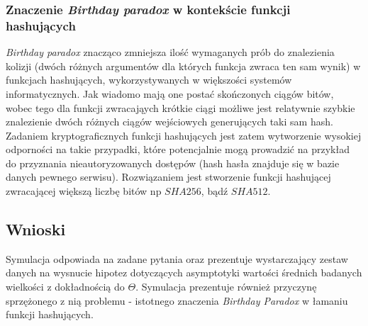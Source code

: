 \documentclass{article}
\begin{document}
\subsubsection{Znaczenie \textit{Birthday paradox} w kontekście funkcji hashujących}

\textit{Birthday paradox} znacząco zmniejsza ilość wymaganych prób do znalezienia kolizji (dwóch różnych argumentów dla których funkcja zwraca ten sam wynik) w funkcjach hashujących, wykorzystywanych w większości systemów informatycznych. Jak wiadomo mają one postać skończonych ciągów bitów, wobec tego dla funkcji zwracająych krótkie ciągi możliwe jest relatywnie szybkie znalezienie dwóch różnych ciągów wejściowych generujących taki sam hash. Zadaniem kryptograficznych funkcji hashujących jest zatem wytworzenie wysokiej odporności na takie przypadki, które potencjalnie mogą prowadzić na przykład do przyznania nieautoryzowanych dostępów (hash hasła znajduje się w bazie danych pewnego serwisu). Rozwiązaniem jest stworzenie funkcji hashującej zwracającej większą liczbę bitów np $SHA256$, bądź $SHA512$.

\subsection{Wnioski}

Symulacja odpowiada na zadane pytania oraz prezentuje wystarczający zestaw danych na wysnucie hipotez dotyczących asymptotyki wartości średnich badanych wielkości z dokładnością do $\Theta$. Symulacja prezentuje również przyczynę sprzężonego z nią problemu - istotnego znaczenia \textit{Birthday Paradox} w łamaniu funkcji hashujących.
\end{document}
